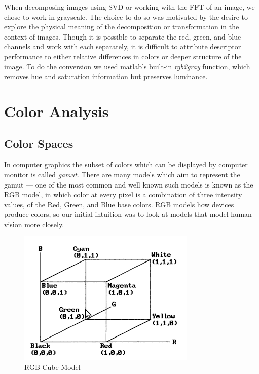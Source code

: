 \documentclass{report}
\begin{document}
When decomposing images using SVD or working with the FFT of an image, we chose to work in grayscale. The choice to do so was motivated by the desire to explore the physical meaning of the decomposition or transformation in the context of images. Though it is possible to separate the red, green, and blue channels and work with each separately, it is difficult to attribute descriptor performance to either relative differences in colors or deeper structure of the image. To do the conversion we used matlab's built-in \textit{rgb2gray} function, which removes hue and saturation information but preserves luminance.

\section{Color Analysis}
\label{sec:color}
\subsection{Color Spaces}
\label{sec:colorSpaces}
In computer graphics the subset of colors which can be displayed by computer monitor is called \emph{gamut}\cite{color_model_ref}. There are many models which aim to represent the gamut --- one of the most common and well known such models is known as the RGB model, in which color at every pixel is a combination of three intensity values, of the Red, Green, and Blue base colors. RGB models how devices produce colors, so our initial intuition was to look at models that model human vision more closely.  
\begin{figure}[hbtp]
\centering
\includegraphics[scale=0.5]{graphics/rgb_cube.png}
\caption{RGB Cube Model}
\end{figure}
\end{document}
